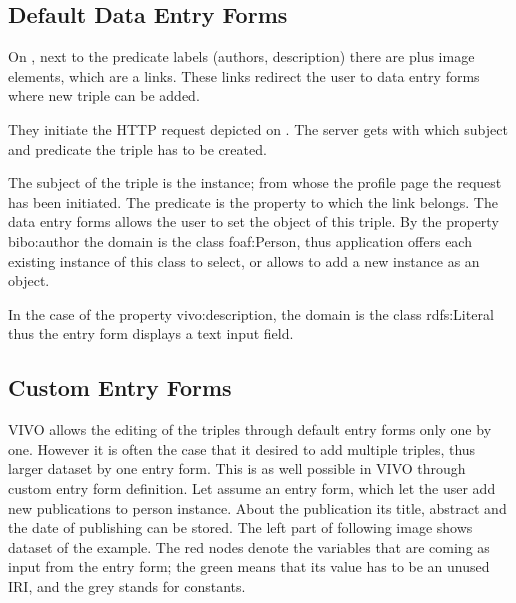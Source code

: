 \subsection{Default Data Entry Forms}

On , next to the predicate labels (authors, description) there are plus image elements, which are a links. These links redirect the user to data entry forms where new triple can be added. 


They initiate the HTTP request depicted on . The server gets with which subject and predicate the triple has to be created.

The subject of the triple is the instance; from whose the profile page the request has been initiated. The predicate is the property to which the link belongs. The data entry forms allows the user to set the object of this triple. By the property bibo:author the domain is the class foaf:Person, thus application offers each existing instance of this class to select, or allows to add a new instance as an object. 


In the case of the property vivo:description, the domain is the class rdfs:Literal thus the entry form displays a text input field.



\subsection{Custom Entry Forms} \label{vivoCef}

VIVO allows the editing of the triples through default entry forms only one by one. However it is often the case that it desired to add multiple triples, thus larger dataset by one entry form. This is as well possible in VIVO through custom entry form definition.
Let assume an entry form, which let the user add new publications to person instance. About the publication its title, abstract and the date of publishing can be stored. The left part of following image shows dataset of the example. The red nodes denote the variables that are coming as input from the entry form; the green means that its value has to be an unused IRI, and the grey stands for constants. 

